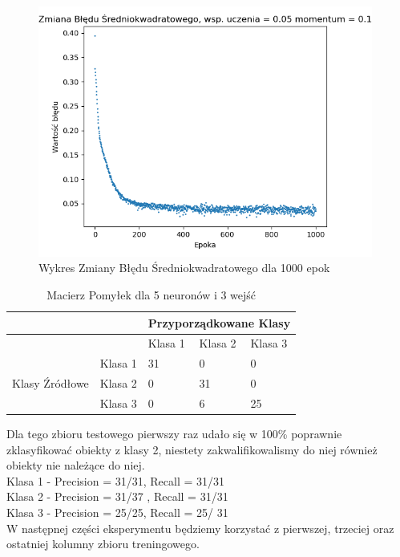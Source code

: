 \documentclass[12pt]{article}
\begin{document}
\begin{figure}[!ht]
 \centering
 \includegraphics[width=11cm]{WykresBlad5neuron3wejscia3.png}
 \caption{Wykres Zmiany Błędu Średniokwadratowego dla 1000 epok}
 \vspace{-0.1cm}
 \label{WykresBlad7}
\end{figure}
\newpage 

\begin{table}
\caption{\label{tab:tablica6} Macierz Pomyłek dla 5 neuronów i 3 wejść }
\begin{tabular}{ |p{3cm}|p{3cm}|p{2cm}|p{2cm}|p{2cm}|  }
 \hline
 & & 
 \multicolumn{3}{|c|}{Przyporządkowane Klasy} \\
 \hline

   & & Klasa 1 & Klasa 2 & Klasa 3\\
 \hline
\multirow{3}{4em}{Klasy Źródłowe}
   & Klasa 1 & 31 & 0 & 0 \\ 
   & Klasa 2 & 0 & 31 & 0 \\
   & Klasa 3 & 0 & 6 & 25 \\

 \hline
\end{tabular}
\end{table}
Dla tego zbioru testowego pierwszy raz udało się w 100\% poprawnie zklasyfikować obiekty z klasy 2, niestety zakwalifikowalismy do niej również obiekty nie należące do niej.
\\Klasa 1 - Precision = 31/31, Recall = 31/31\\
Klasa 2 - Precision = 31/37 , Recall = 31/31\\
Klasa 3 - Precision = 25/25, Recall = 25/ 31\\
W następnej części eksperymentu będziemy korzystać z pierwszej, trzeciej oraz ostatniej kolumny zbioru treningowego.
\end{document}
